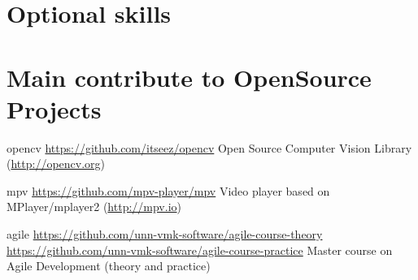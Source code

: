 \documentclass[11pt,a4paper]{moderncv}
\begin{document}
\section{Optional skills}


\section{Main contribute to OpenSource Projects}
\cvline
  {opencv}
  {\url{https://github.com/itseez/opencv}\newline{}
  Open Source Computer Vision Library (\url{http://opencv.org})}

\cvline
  {mpv}
  {\url{https://github.com/mpv-player/mpv}\newline{}
  Video player based on MPlayer/mplayer2 (\url{http://mpv.io})}

\cvline
  {agile}
  {
  \url{https://github.com/unn-vmk-software/agile-course-theory}\newline{}
  \url{https://github.com/unn-vmk-software/agile-course-practice}\newline{}
  Master course on Agile Development (theory and practice)
  }
\end{document}
